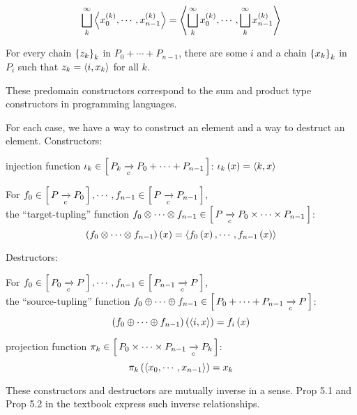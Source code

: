 \begin{enumcirc}
\begin{enumrm}
\begin{enumalpha}
			\[
				\bigsqcup_k^\infty \left\langle x_0^{(k)}, \cdots, x_{n-1}^{(k)} \right\rangle =
				\left\langle \bigsqcup_k^\infty x_0^{(k)}, \cdots, \bigsqcup_k^\infty x_{n-1}^{(k)} \right\rangle
			\]
			\item
			For every chain $\left\{ z_k \right\}_k$ in $P_0 + \cdots + P_{n-1}$, there are some
			$i$ and a chain $\left\{ x_k \right\}_k$ in $P_i$ such that $z_k = \left\langle i, x_k \right\rangle$
			for all $k$.
		\end{enumalpha}
		\item
		These predomain constructors correspond to the sum and product type
		constructors in programming languages.
		\item
		For each case, we have a way to construct an element and a way to destruct an
		element.
		Constructors:
		\begin{enumalpha}
			\item
			injection function $\iota_k \in \left[ \, P_k \xrightarrow[c]{} P_0 + \cdots + P_{n-1} \, \right]$:
			$\iota_k \left( x \right) = \left\langle k, x \right\rangle$
			\item
			For
			$f_0 \in \left[ \, P \xrightarrow[c]{} P_0 \, \right], \cdots, f_{n-1} \in \left[ \, P \xrightarrow[c]{} P_{n-1} \, \right]$,\\
			the ``target-tupling'' function
			$f_0 \otimes \cdots \otimes f_{n-1} \in \left[ \, P \xrightarrow[c]{} P_0 \times \cdots \times P_{n-1} \, \right]$:\\
			\[
				\left( f_0 \otimes \cdots \otimes f_{n-1} \right)\left( x \right) = \left\langle f_0\left( x \right), \cdots, f_{n-1}\left( x \right) \right\rangle
			\]
		\end{enumalpha}
		Destructors:
		\begin{enumalpha}
			\item
			For
			$f_0 \in \left[ \, P_0 \xrightarrow[c]{} P \, \right], \cdots, f_{n-1} \in \left[ \, P_{n-1} \xrightarrow[c]{} P \, \right]$,\\
			the ``source-tupling'' function
			$f_0 \oplus \cdots \oplus f_{n-1} \in \left[ \, P_0 + \cdots + P_{n-1} \xrightarrow[c]{} P \, \right]$:\\
			\[
				\left( f_0 \oplus \cdots \oplus f_{n-1} \right)\left( \left\langle i, x \right\rangle \right) = f_i\left( x \right)
			\]
			\item
			projection function
			$\pi_k \in \left[ \, P_0 \times \cdots \times P_{n-1} \xrightarrow[c]{} P_k \, \right]$:
			\[
				\pi_k\left( \left\langle x_0, \cdots, x_{n-1} \right\rangle \right) = x_k
			\]
		\end{enumalpha}
		These constructors and destructors are mutually inverse in a sense.
		Prop 5.1 and Prop 5.2 in the textbook express such inverse relationships.

\end{enumrm}
\end{enumcirc}
